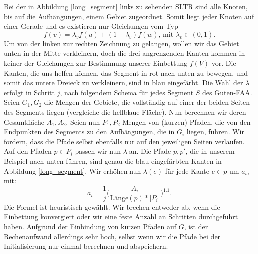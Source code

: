 \begin{example}\label{bsp_long_segment}
Bei der in Abbildung \ref{long_segment} links zu sehenden SLTR sind alle Knoten, bis auf die Aufhängungen, einem Gebiet zugeordnet. Somit liegt jeder Knoten auf einer Gerade und es existieren nur Gleichungen vom Typ
$$ f(v) = \lambda_v f(u) + (1-\lambda_v)f(w) \text{, mit } \lambda_v \in (0,1).$$
Um von der linken zur rechten Zeichnung zu gelangen, wollen wir das Gebiet unten in der Mitte verkleinern, doch die drei angrenzenden Kanten kommen in keiner der Gleichungen zur Bestimmung unserer Einbettung $f(V)$ vor. Die Kanten, die uns helfen können, das Segment in rot nach unten zu bewegen, und somit das untere Dreieck zu verkleinern, sind in blau eingefärbt. Die Wahl der $\lambda$ erfolgt in Schritt $j$, nach folgendem Schema für jedes Segment $S$ des Guten-FAA. Seien $G_1,G_2$ die Mengen der Gebiete, die vollständig auf einer der beiden Seiten des Segments liegen (vergleiche die hellblaue Fläche). Nun berechnen wir deren Gesamtfläche $A_1,A_2$. Seien nun $P_1,P_2$ Mengen von (kurzen) Pfaden, die von den Endpunkten des Segments zu den Aufhängungen, die in $G_i$ liegen, führen. Wir fordern, dass die Pfade selbst ebenfalls nur auf den jeweiligen Seiten verlaufen. Auf den Pfaden $p \in P_i$ passen wir nun $\lambda$ an. Die Pfade $p,p'$, die in unserem Beispiel nach unten führen, sind genau die blau eingefärbten Kanten in Abbildung \ref{long_segment}. Wir erhöhen nun $\lambda(e)$ für jede Kante $e \in p$ um $a_i$, mit:
$$ a_i = \frac{1}{j} \Big( \frac{A_i}{\text{Länge}(p)*|P_i|}\Big)^{1.1}.$$
Die Formel ist heuristisch gewählt. Wir brechen entweder ab, wenn die Einbettung konvergiert oder wir eine feste Anzahl an Schritten durchgeführt haben. Aufgrund der Einbindung von kurzen Pfaden auf $G$, ist der Rechenaufwand allerdings sehr hoch, selbst wenn wir die Pfade bei der Initialisierung nur einmal berechnen und abspeichern.
\end{example}

